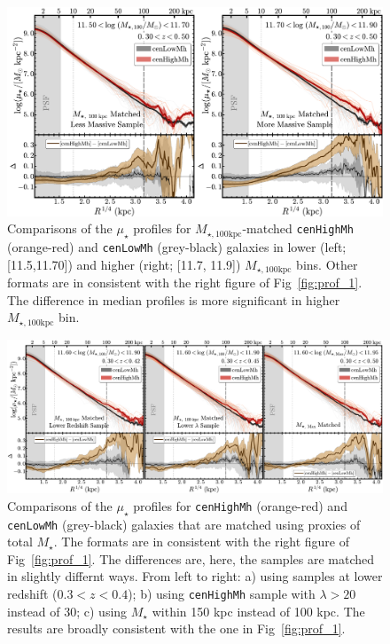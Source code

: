 \documentclass{emulateapj}
\def\rbcg{\texttt{cenHighMh}}
\def\nbcg{\texttt{cenLowMh}}
\def\mstar{{$M_{\star}$}}
\def\mtot{{$M_{\star,100\mathrm{kpc}}$}}
\def\mden{{$\mu_{\star}$}}
\begin{document}
\begin{CJK*}{UTF8}{gbsn}
  \begin{figure}[t]
      \centering 
      \includegraphics[width=\textwidth]{fig/redbcg_prof_2}
      \caption{
          Comparisons of the \mden{} profiles for \mtot{}-matched \rbcg{} 
          (orange-red) and \nbcg{} (grey-black) galaxies in lower (left; [11.5,11.70]) 
          and higher (right; [11.7, 11.9]) \mtot{} bins. 
          Other formats are in consistent with the right figure of Fig~\ref{fig:prof_1}.
          The difference in median profiles is more significant in higher \mtot{} bin.
          }
      \label{fig:prof_2}
  \end{figure}

  \begin{figure}[t!]
      \centering 
      \includegraphics[width=\textwidth]{fig/redbcg_prof_3}
      \caption{
        Comparisons of the \mden{} profiles for \rbcg{} (orange-red) and \nbcg{} 
      	(grey-black) galaxies that are matched using proxies of total \mstar{}. 
        The formats are in consistent with the right figure of Fig~\ref{fig:prof_1}.
        The differences are, here, the samples are matched in slightly differnt ways. 
        From left to right: a) using samples at lower redshift ($0.3 < z < 0.4$); 
        b) using \rbcg{} sample with $\lambda > 20$ instead of 30; 
        c) using \mstar{} within 150 kpc instead of 100 kpc.
        The results are broadly consistent with the one in Fig~\ref{fig:prof_1}.
        }
      \label{fig:prof_3} 
  \end{figure}


\end{CJK*}
\end{document}
